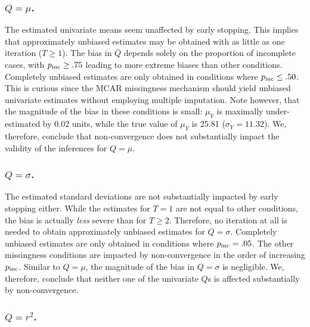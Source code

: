 \documentclass[Royal,times,sageh]{sagej}
\begin{document}
\hypertarget{qmu.}{%
\subsubsection{\texorpdfstring{\(Q=\mu\).}{Q=\textbackslash mu.}}\label{qmu.}}

The estimated univariate means seem unaffected by early stopping. This implies that approximately unbiased estimates may be obtained with as little as one iteration (\(T \geq 1\)). The bias in \(\bar{Q}\) depends solely on the proportion of incomplete cases, with \(p_{\rm inc}\geq.75\) leading to more extreme biases than other conditions. Completely unbiased estimates are only obtained in conditions where \(p_{\rm inc}\leq.50\). This is curious since the MCAR missingness mechanism should yield unbiased univariate estimates without employing multiple imputation. Note however, that the magnitude of the bias in these conditions is small: \(\mu_Y\) is maximally under-estimated by 0.02 units, while the true value of \(\mu_Y\) is 25.81 (\(\sigma_Y = 11.32\)). We, therefore, conclude that non-convergence does not substantially impact the validity of the inferences for \(Q=\mu\).

\hypertarget{qsigma.}{%
\subsubsection{\texorpdfstring{\(Q=\sigma\).}{Q=\textbackslash sigma.}}\label{qsigma.}}

The estimated standard deviations are not substantially impacted by early stopping either. While the estimates for \(T=1\) are not equal to other conditions, the bias is actually \emph{less} severe than for \(T\geq2\). Therefore, no iteration at all is needed to obtain approximately unbiased estimates for \(Q=\sigma\). Completely unbiased estimates are only obtained in conditions where \(p_{\rm inc}=.05\). The other missingness conditions are impacted by non-convergence in the order of increasing \(p_{\rm inc}\). Similar to \(Q=\mu\), the magnitude of the bias in \(Q=\sigma\) is negligible. We, therefore, conclude that neither one of the univariate \(Q\)s is affected substantially by non-convergence.

\hypertarget{qr2.}{%
\subsubsection{\texorpdfstring{\(Q=r^2\).}{Q=r\^{}2.}}\label{qr2.}}
\end{document}
